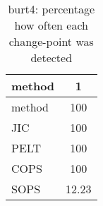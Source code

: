 \begin{table}[ht]
\centering
\begin{tabular}{l|c}
  \hline
method & 1 \\ 
  \hline
method &    100 \\ 
  JIC &    100 \\ 
  PELT &    100 \\ 
  COPS &    100 \\ 
  SOPS &  12.23 \\ 
   \hline
\end{tabular}
\caption{burt4: percentage how often each change-point was detected} 
\label{tab:burt4Detections}
\end{table}
